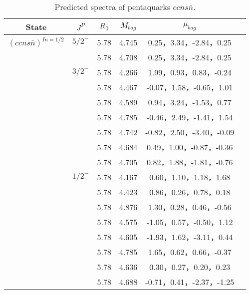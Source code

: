 \documentclass[prd,twocolumn,floatfix,nofootinbib]{revtex4}
\begin{document}
 \begin{table*}[!htbp]
    \caption{Predicted spectra of pentaquarks $ccns\bar{n}$.}
    \begin{tabular}{cccccc}
        \hline\hline
  {\rm State} &$J^{P}$ &$R_{0}$ &$M_{bag}$ &$\mu_{bag}$  \\ \hline
   ${(ccns\bar{n})}^{I{n}=1/2}$
            &${5/2}^{-}$     &5.78   &4.745 &0.25，3.34，-2.84，0.25  \\
                         &$ $     &5.78   &4.708 &0.25，3.34，-2.84，0.25  \\
            &${3/2}^{-}$     &5.78   &4.266 &1.99，0.93，0.83，-0.24 \\
                         &$ $     &5.78   &4.467 &-0.07，1.58，-0.65，1.01  \\
                         &$ $     &5.78   &4.589 &0.94，3.24，-1.53，0.77  \\
                         &$ $     &5.78   &4.785 &-0.46，2.49，-1.41，1.54 \\
                         &$ $     &5.78   &4.742 &-0.82，2.50，-3.40，-0.09  \\
                         &$ $     &5.78   &4.684 &0.49，1.00，-0.87，-0.36  \\
                         &$ $     &5.78   &4.705 &0.82，1.88，-1.81，-0.76  \\
            &${1/2}^{-}$     &5.78   &4.167 &0.60，1.10，1.18，1.68  \\
                         &$ $     &5.78   &4.423 &0.86，0.26，0.78，0.18  \\
                         &$ $     &5.78   &4.876 &1.30，0.28，0.46，-0.56  \\
                         &$ $     &5.78   &4.575 &-1.05，0.57，-0.50，1.12  \\
                         &$ $     &5.78   &4.605 &-1.93，1.62，-3.11，0.44  \\
                         &$ $     &5.78   &4.785 &1.65，0.62，0.66，-0.37  \\
                         &$ $     &5.78   &4.636 &0.30，0.27，0.20，0.23  \\
                         &$ $     &5.78   &4.688 &-0.71，0.41，-2.37，-1.25  \\
        \hline\hline
    \end{tabular}
\end{table*}
\end{document}
